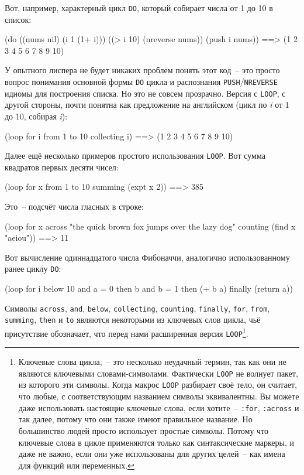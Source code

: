 Вот, например, характерный цикл \lstinline{DO}, который собирает числа от 1 до 10 в список:

\begin{myverb}
(do ((nums nil) (i 1 (1+ i)))
    ((> i 10) (nreverse nums))
  (push i nums)) ==> (1 2 3 4 5 6 7 8 9 10)
\end{myverb}

У опытного лиспера не будет никаких проблем понять этот код~-- это просто вопрос
понимания основной формы \lstinline{DO} цикла и распознания \lstinline{PUSH}/\lstinline{NREVERSE} идиомы
для построения списка. Но это не совсем прозрачно. Версия с \lstinline{LOOP}, с другой стороны,
почти понятна как предложение на английском (цикл по \textit{i} от 1 до 10, собирая
\textit{i}):

\begin{myverb}
(loop for i from 1 to 10 collecting i) ==> (1 2 3 4 5 6 7 8 9 10)
\end{myverb}

Далее ещё несколько примеров простого использования \lstinline{LOOP}. Вот сумма квадратов
первых десяти чисел:

\begin{myverb}
(loop for x from 1 to 10 summing (expt x 2)) ==> 385
\end{myverb}

Это~-- подсчёт числа гласных в строке:

\begin{myverb}
(loop for x across "the quick brown fox jumps over the lazy dog"
      counting (find x "aeiou")) ==> 11
\end{myverb}

Вот вычисление одиннадцатого числа Фибоначчи, аналогично использованному ранее циклу \lstinline{DO}:

\begin{myverb}
(loop for i below 10
      and a = 0 then b
      and b = 1 then (+ b a)
      finally (return  a))
\end{myverb}

Символы \lstinline{across}, \lstinline{and}, \lstinline{below}, \lstinline{collecting}, \lstinline{counting},
\lstinline{finally}, \lstinline{for}, \lstinline{from}, \lstinline{summing}, \lstinline{then} и \lstinline{to} являются
некоторыми из ключевых слов цикла, чьё присутствие обозначает, что перед нами расширенная
версия \lstinline{LOOP}\footnote{Ключевые слова цикла,~-- это несколько неудачный термин, так
  как они не являются ключевыми словами-символами. Фактически \lstinline{LOOP} не волнует
  пакет, из которого эти символы. Когда макрос \lstinline{LOOP} разбирает своё тело, он
  считает, что любые, с соответствующим названием символы эквивалентны. Вы можете даже
  использовать настоящие ключевые слова, если хотите~-- \lstinline{:for}, \lstinline{:across} и так
  далее, потому что они также имеют правильное название. Но большинство людей просто
  использует простые символы. Потому что ключевые слова в цикле применяются только как
  синтаксические маркеры, и даже не важно, если они уже использованы для других целей~--
  как имена для функций или переменных.}.

